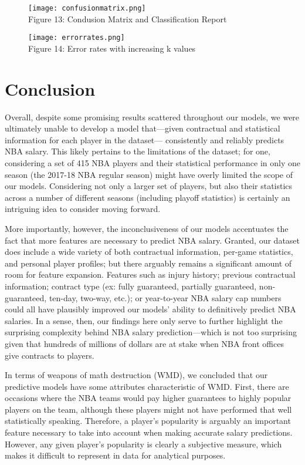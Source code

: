 \documentclass{article}
\begin{document}
\begin{figure}[h]
    \centering
    \texttt{[image: confusionmatrix.png]}
    \\Figure 13: Condusion Matrix and Classification Report\\
\end{figure}

\begin{figure}[h]
    \centering
    \texttt{[image: errorrates.png]}
    \\Figure 14: Error rates with increasing k values\\
\end{figure}


\section{Conclusion}
Overall, despite some promising results scattered throughout our models, we were ultimately unable to develop a model that—given contractual and statistical information for each player in the dataset— consistently and reliably predicts NBA salary. This likely pertains to the limitations of the dataset; for one, considering a set of 415 NBA players and their statistical performance in only one season (the 2017-18 NBA regular season) might have overly limited the scope of our models. Considering not only a larger set of players, but also their statistics across a number of different seasons (including playoff statistics) is certainly an intriguing idea to consider moving forward.

More importantly, however, the inconclusiveness of our models accentuates the fact that more features are necessary to predict NBA salary. Granted, our dataset does include a wide variety of both contractual information, per-game statistics, and personal player profiles; but there arguably remains a significant amount of room for feature expansion. Features such as injury history; previous contractual information; contract type (ex: fully guaranteed, partially guaranteed, non-guaranteed, ten-day, two-way, etc.); or year-to-year NBA salary cap numbers could all have plausibly improved our models' ability to definitively predict NBA salaries. In a sense, then, our findings here only serve to further highlight the surprising complexity behind NBA salary prediction—which is not too surprising given that hundreds of millions of dollars are at stake when NBA front offices give contracts to players.

In terms of weapons of math destruction (WMD), we concluded that our predictive models have some attributes characteristic of WMD. First, there are occasions where the NBA teams would pay higher guarantees to highly popular players on the team, although these players might not have performed that well statistically speaking. Therefore, a player's popularity is arguably an important feature necessary to take into account when making accurate salary predictions. However, any given player's popularity is clearly a subjective measure, which makes it difficult to represent in data for analytical purposes.
\end{document}
